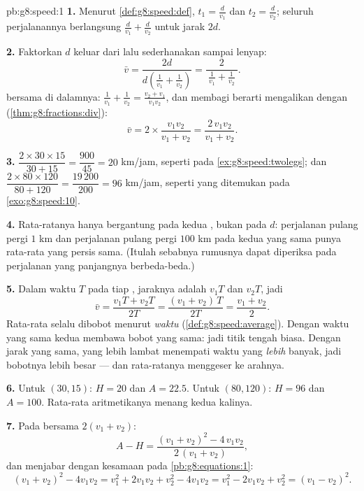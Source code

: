 \begin{solution}{pb:g8:speed:1}
\textbf{1.} Menurut \cref{def:g8:speed:def}, $t_1 = \frac{d}{v_1}$ dan
$t_2 = \frac{d}{v_2}$; seluruh perjalanannya berlangsung
$\frac{d}{v_1} + \frac{d}{v_2}$ untuk jarak $2d$.

\textbf{2.} Faktorkan $d$ keluar dari  lalu sederhanakan
sampai lenyap:
\[
\bar v
= \frac{2d}{d\left(\frac{1}{v_1} + \frac{1}{v_2}\right)}
= \frac{2}{\ \frac{1}{v_1} + \frac{1}{v_2}\ } .
\]
 bersama di dalamnya:
$\frac{1}{v_1} + \frac{1}{v_2} = \frac{v_2 + v_1}{v_1 v_2}$, dan
membagi berarti mengalikan dengan 
(\cref{thm:g8:fractions:div}):
\[
\bar v = 2 \times \frac{v_1 v_2}{v_1 + v_2}
= \frac{2\, v_1 v_2}{v_1 + v_2} .
\]

\textbf{3.} $\dfrac{2 \times 30 \times 15}{30 + 15}
= \dfrac{900}{45} = 20$ km/jam, seperti pada
\cref{ex:g8:speed:twolegs}; dan
$\dfrac{2 \times 80 \times 120}{80 + 120} = \dfrac{19\,200}{200}
= 96$ km/jam, seperti yang ditemukan pada \cref{exo:g8:speed:10}.

\textbf{4.} Rata-ratanya hanya bergantung pada kedua ,
bukan pada $d$: perjalanan pulang pergi $1$ km dan perjalanan pulang
pergi $100$ km pada kedua  yang sama punya 
rata-rata yang persis sama. (Itulah sebabnya rumusnya dapat diperiksa
pada perjalanan yang panjangnya berbeda-beda.)

\textbf{5.} Dalam waktu $T$ pada tiap , jaraknya adalah
$v_1 T$ dan $v_2 T$, jadi
\[
\bar v = \frac{v_1 T + v_2 T}{2T}
= \frac{(v_1 + v_2)\,T}{2T}
= \frac{v_1 + v_2}{2} .
\]
Rata-rata  selalu dibobot menurut \emph{waktu}
(\cref{def:g8:speed:average}). Dengan waktu yang sama kedua
 membawa bobot yang sama: jadi titik tengah biasa. Dengan
jarak yang sama,  yang lebih lambat menempati waktu yang
\emph{lebih} banyak, jadi bobotnya lebih besar --- dan rata-ratanya
menggeser ke arahnya.

\textbf{6.} Untuk $(30, 15)$: $H = 20$ dan $A = 22.5$. Untuk
$(80, 120)$: $H = 96$ dan $A = 100$. Rata-rata aritmetikanya menang
kedua kalinya.

\textbf{7.} Pada  bersama $2(v_1 + v_2)$:
\[
A - H
= \frac{(v_1 + v_2)^2 - 4\, v_1 v_2}{2\,(v_1 + v_2)} ,
\]
dan  menjabar dengan kesamaan pada
\cref{pb:g8:equations:1}:
\[
(v_1 + v_2)^2 - 4 v_1 v_2
= v_1^2 + 2 v_1 v_2 + v_2^2 - 4 v_1 v_2
= v_1^2 - 2 v_1 v_2 + v_2^2
= (v_1 - v_2)^2 .
\]


\end{solution}
